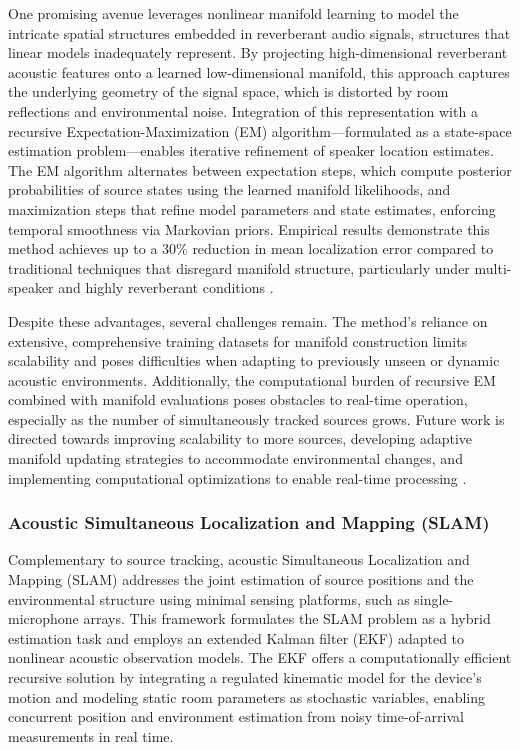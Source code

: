 \documentclass[sigconf]{acmart}
\begin{document}
One promising avenue leverages nonlinear manifold learning to model the intricate spatial structures embedded in reverberant audio signals, structures that linear models inadequately represent. By projecting high-dimensional reverberant acoustic features onto a learned low-dimensional manifold, this approach captures the underlying geometry of the signal space, which is distorted by room reflections and environmental noise. Integration of this representation with a recursive Expectation-Maximization (EM) algorithm—formulated as a state-space estimation problem—enables iterative refinement of speaker location estimates. The EM algorithm alternates between expectation steps, which compute posterior probabilities of source states using the learned manifold likelihoods, and maximization steps that refine model parameters and state estimates, enforcing temporal smoothness via Markovian priors. Empirical results demonstrate this method achieves up to a 30\% reduction in mean localization error compared to traditional techniques that disregard manifold structure, particularly under multi-speaker and highly reverberant conditions \cite{ref38}.

Despite these advantages, several challenges remain. The method's reliance on extensive, comprehensive training datasets for manifold construction limits scalability and poses difficulties when adapting to previously unseen or dynamic acoustic environments. Additionally, the computational burden of recursive EM combined with manifold evaluations poses obstacles to real-time operation, especially as the number of simultaneously tracked sources grows. Future work is directed towards improving scalability to more sources, developing adaptive manifold updating strategies to accommodate environmental changes, and implementing computational optimizations to enable real-time processing \cite{ref38}.

\subsubsection{Acoustic Simultaneous Localization and Mapping (SLAM)}

Complementary to source tracking, acoustic Simultaneous Localization and Mapping (SLAM) addresses the joint estimation of source positions and the environmental structure using minimal sensing platforms, such as single-microphone arrays. This framework formulates the SLAM problem as a hybrid estimation task and employs an extended Kalman filter (EKF) adapted to nonlinear acoustic observation models. The EKF offers a computationally efficient recursive solution by integrating a regulated kinematic model for the device’s motion and modeling static room parameters as stochastic variables, enabling concurrent position and environment estimation from noisy time-of-arrival measurements in real time.
\end{document}
